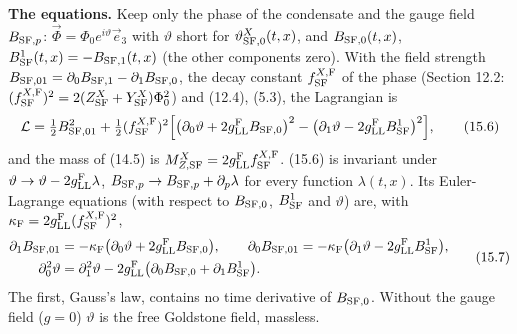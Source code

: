 \documentclass[
  10pt,
]{article}
\begin{document}
\textbf{The equations.} Keep only the phase of the condensate and the
gauge field \(B_{{\rm SF},p}\):
\(\vec\Phi=\Phi_0e^{i\vartheta}\vec e_3\) with \(\vartheta\) short for
\(\vartheta^X_{{\rm SF},0}(t,x)\), and \(B_{{\rm SF},0}(t,x)\),
\(B^1_{\rm SF}(t,x)=-B_{{\rm SF},1}(t,x)\) (the other components zero).
With the field strength
\(B_{{\rm SF},01}=\partial_0B_{{\rm SF},1}-\partial_1B_{{\rm SF},0}\),
the decay constant \(f^{X,{\rm F}}_{\rm SF}\) of the phase (Section
12.2:
\((f^{X,{\rm F}}_{\rm SF})^2=2(Z^X_{\rm SF}+Y^X_{\rm SF})\Phi_0^2\)) and
(12.4), (5.3), the Lagrangian is
\[\mathcal L=\tfrac12B_{{\rm SF},01}^2+\tfrac12(f^{X,{\rm F}}_{\rm SF})^2\Big[\big(\partial_0\vartheta+2g^{\rm F}_{\rm LL}B_{{\rm SF},0}\big)^2-\big(\partial_1\vartheta-2g^{\rm F}_{\rm LL}B^1_{\rm SF}\big)^2\Big],\tag{15.6}\]
and the mass of (14.5) is
\(M^X_{Z,{\rm SF}}=2g^{\rm F}_{\rm LL}f^{X,{\rm F}}_{\rm SF}\). (15.6)
is invariant under \(\vartheta\to\vartheta-2g^{\rm F}_{\rm LL}\lambda\),
\(B_{{\rm SF},p}\to B_{{\rm SF},p}+\partial_p\lambda\) for every
function \(\lambda(t,x)\). Its Euler-Lagrange equations (with respect to
\(B_{{\rm SF},0}\), \(B^1_{\rm SF}\) and \(\vartheta\)) are, with
\(\kappa_{\rm F}=2g^{\rm F}_{\rm LL}(f^{X,{\rm F}}_{\rm SF})^2\),
\[\begin{aligned}\partial_1B_{{\rm SF},01}&=-\kappa_{\rm F}\big(\partial_0\vartheta+2g^{\rm F}_{\rm LL}B_{{\rm SF},0}\big),\qquad\partial_0B_{{\rm SF},01}=-\kappa_{\rm F}\big(\partial_1\vartheta-2g^{\rm F}_{\rm LL}B^1_{\rm SF}\big),\\\partial_0^2\vartheta&=\partial_1^2\vartheta-2g^{\rm F}_{\rm LL}\big(\partial_0B_{{\rm SF},0}+\partial_1B^1_{\rm SF}\big).\end{aligned}\tag{15.7}\]
The first, Gauss's law, contains no time derivative of
\(B_{{\rm SF},0}\). Without the gauge field (\(g=0\)) \(\vartheta\) is
the free Goldstone field, massless.
\end{document}
